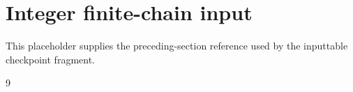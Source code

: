\documentclass[11pt]{article}
\begin{document}
\section{Integer finite-chain input}
\label{sec:steinberg-integer-finite-chain}
This placeholder supplies the preceding-section reference used by the
inputtable checkpoint fragment.



\begin{thebibliography}{9}

\end{thebibliography}
\end{document}
